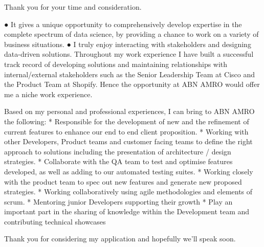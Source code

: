 \documentclass[11pt, a4paper]{awesome-cv}
\begin{document}
\begin{cvletter}
Thank you for your time and consideration.



● It gives a unique opportunity to comprehensively develop expertise in the complete spectrum of
data science, by providing a chance to work on a variety of business situations.
● I truly enjoy interacting with stakeholders and designing data-driven solutions. Throughout my
work experience I have built a successful track record of developing solutions and maintaining
relationships with internal/external stakeholders such as the Senior Leadership Team at Cisco and
the Product Team at Shopify. Hence the opportunity at ABN AMRO would offer me a niche work
experience.

Based on my personal and professional experiences, I can bring to ABN AMRO the following:
* Responsible for the development of new and the refinement of current features to enhance our end to end client proposition.
* Working with other Developers, Product teams and customer facing teams to define the right approach to solutions including the presentation of architecture / design strategies.
* Collaborate with the QA team to test and optimise features developed, as well as adding to our automated testing suites.
* Working closely with the product team to spec out new features and generate new proposed strategies.
* Working collaboratively using agile methodologies and elements of scrum.
* Mentoring junior Developers supporting their growth
* Play an important part in the sharing of knowledge within the Development team and contributing technical showcases

Thank you for considering my application and hopefully we’ll speak soon.
\end{cvletter}
\makeletterclosing
\end{document}
